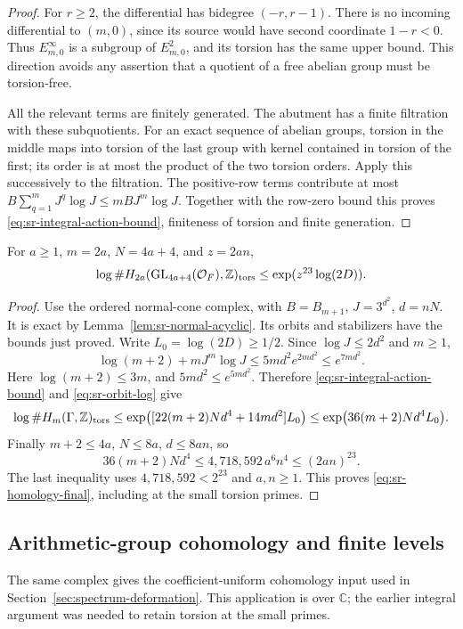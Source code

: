\begin{proof}
For \(r\geq2\), the differential has bidegree \((-r,r-1)\).
There is no incoming differential to \((m,0)\), since its source
would have second coordinate \(1-r<0\).
Thus \(E^\infty_{m,0}\) is a subgroup of \(E^2_{m,0}\), and its
torsion has the same upper bound.
This direction avoids any assertion that a quotient of a free
abelian group must be torsion-free.

All the relevant terms are finitely generated.
The abutment has a finite filtration with these subquotients.
For an exact sequence of abelian groups, torsion in the middle
maps into torsion of the last group with kernel contained in
torsion of the first; its order is at most the product of the
two torsion orders.
Apply this successively to the filtration.
The positive-row terms contribute at most
\(B\sum_{q=1}^mJ^q\log J\leq mBJ^m\log J\).
Together with the row-zero bound this proves
\eqref{eq:sr-integral-action-bound}, finiteness of torsion and finite
generation.
\end{proof}

\begin{srproposition}\label{prop:sr-all-prime-homology}
For \(a\geq1\), \(m=2a\), \(N=4a+4\), and \(z=2an\),
\begin{equation}\label{eq:sr-homology-final}
 \log\#H_{2a}(\mathrm{GL}_{4a+4}(\mathcal O_F),\mathbb Z)_{\rm tors}
                           \leq\exp(z^{23}\log(2D)).
\end{equation}
\end{srproposition}
\begin{proof}
Use the ordered normal-cone complex, with
\(B=B_{m+1}\), \(J=3^{d^2}\), \(d=nN\).
It is exact by Lemma~\ref{lem:sr-normal-acyclic}.
Its orbits and stabilizers have the bounds just proved.
Write \(L_0=\log(2D)\geq1/2\).
Since \(\log J\leq2d^2\) and \(m\geq1\),
\[
 \log(m+2)+mJ^m\log J
       \leq5md^2e^{2md^2}\leq e^{7md^2}.
\]
Here \(\log(m+2)\leq3m\), and \(5md^2\leq e^{5md^2}\).
Therefore \eqref{eq:sr-integral-action-bound} and
\eqref{eq:sr-orbit-log} give
\[
 \log\#H_m(\Gamma,\mathbb Z)_{\rm tors}
 \leq
 \exp\bigl([22(m+2)Nd^4+14md^2]L_0\bigr)
 \leq \exp\bigl(36(m+2)Nd^4L_0\bigr).
\]
Finally \(m+2\leq4a\), \(N\leq8a\), \(d\leq8an\), so
\[
 36(m+2)Nd^4
       \leq 4{,}718{,}592\,a^6n^4
       \leq (2an)^{23}.
\]
The last inequality uses \(4{,}718{,}592<2^{23}\) and \(a,n\geq1\).
This proves \eqref{eq:sr-homology-final}, including at the small
torsion primes.
\end{proof}


\subsection{Arithmetic-group cohomology and finite levels}
\label{sec:sr-arithmetic-cohomology}
The same complex gives the coefficient-uniform cohomology input used
in Section~\ref{sec:spectrum-deformation}.
This application is over \(\mathbb C\); the earlier integral argument
was needed to retain torsion at the small primes.

